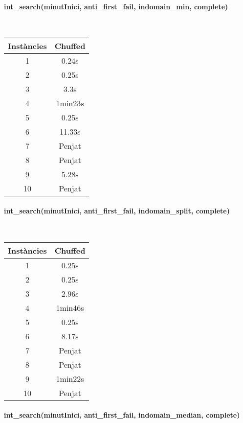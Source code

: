 \documentclass[11pt,a4paper,twoside]{report}
\begin{document}
\paragraph*{int\_search(minutInici, anti\_first\_fail, indomain\_min, complete)} ~\\

\begin{tabular}{|c|c|}
    \hline
    Instàncies & Chuffed \\
    \hline
    1 & 0.24s \\
    2 & 0.25s \\
    3 & 3.3s  \\
    4 & 1min23s \\
    5 & 0.25s  \\
    6 & 11.33s  \\
    7 & Penjat   \\
    8 & Penjat   \\
    9 & 5.28s \\
    10 & Penjat   \\
    \hline
\end{tabular}


\paragraph*{int\_search(minutInici, anti\_first\_fail, indomain\_split, complete)}~\\

\begin{tabular}{|c|c|}
    \hline
    Instàncies & Chuffed \\
    \hline
    1 & 0.25s \\
    2 & 0.25s \\
    3 & 2.96s  \\
    4 & 1min46s \\
    5 & 0.25s  \\
    6 & 8.17s  \\
    7 & Penjat   \\
    8 & Penjat   \\
    9 & 1min22s \\
    10 & Penjat   \\
    \hline
\end{tabular}

\paragraph*{int\_search(minutInici, anti\_first\_fail, indomain\_median, complete)}~\\
\end{document}
